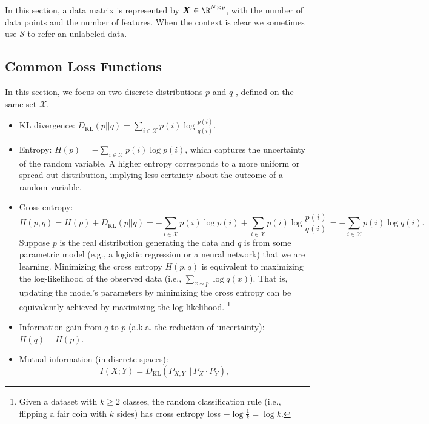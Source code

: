 

In this section, a data matrix is represented by $\bm{X} \in \R^{\ndata \times \nfeat}$, with \ndata the number of data points and \nfeat the number of features. 
When the context is clear we sometimes use $\mathcal{S}$ to refer an unlabeled data. 

\subsection{Common Loss Functions}
In this section, we focus on two discrete distributions $p$ and $q$ , defined on the same set $\mathcal{X}$.
    \begin{itemize}
        \item KL divergence: $D_\text{KL}(p || q) = \sum_{i \in \mathcal{X}}^{}{p(i) \log \frac{p(i)}{q(i)}}$.
        \item Entropy:  $H(p) = -\sum_{i \in \mathcal{X}}^{}{p(i) \log p(i)}$, which captures the uncertainty of the random variable. 
        A higher entropy corresponds to a more uniform or spread-out distribution, implying less certainty about the outcome of a random variable.
        \item Cross entropy:
            \begin{equation*}
               H(p, q) = H(p) + D_\text{KL}(p || q) =  -\sum_{i \in \mathcal{X}}^{}{p(i) \log p(i)} + \sum_{i \in \mathcal{X}}^{}{p(i) \log \frac{p(i)}{q(i)}} =  -\sum_{i \in \mathcal{X}}^{}{p(i) \log q(i)}.
            \end{equation*}
        Suppose $p$ is the real distribution generating the data and $q$ is from some parametric model (e,g., a logistic regression or a neural network) that we are learning.
        Minimizing the cross entropy $H(p, q)$ is equivalent to maximizing the log-likelihood of the observed data (i.e., $\sum_{x \sim p}^{}{\log q(x)}$). That is, updating the model's parameters by minimizing the cross entropy can be equivalently achieved by maximizing the log-likelihood.
        \footnote{Given a dataset with $k \ge 2$ classes, the random classification rule (i.e., flipping a fair coin with $k$ sides) has cross entropy loss $-\log{\frac{1}{k}} = \log{k}$.}
        \item Information gain from $q$ to $p$ (a.k.a. the reduction of uncertainty): $H(q) - H(p)$.
        \item Mutual information (in discrete spaces): 
            \begin{equation*}
                I(X; Y) = D_\text{KL}\left( P_{X, Y} \, || \, P_X \cdot P_Y \right),

\end{equation*}
\end{itemize}
